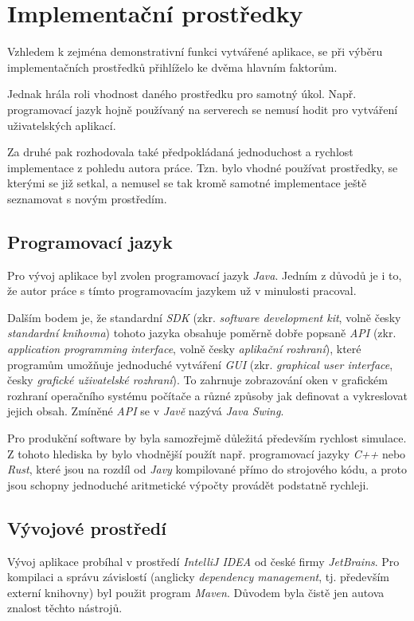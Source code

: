 \section{Implementační prostředky}

Vzhledem k zejména demonstrativní funkci vytvářené aplikace, se při výběru implementačních prostředků přihlíželo ke dvěma hlavním faktorům.

Jednak hrála roli vhodnost daného prostředku pro samotný úkol. Např. programovací jazyk hojně používaný na serverech se nemusí hodit pro vytváření uživatelských aplikací.

Za druhé pak rozhodovala také předpokládaná jednoduchost a rychlost implementace z pohledu autora práce. Tzn. bylo vhodné používat prostředky, se kterými se již setkal, a nemusel se tak kromě samotné implementace ještě seznamovat s novým prostředím.

\subsection{Programovací jazyk}

Pro vývoj aplikace byl zvolen programovací jazyk \emph{Java}. \parencite{gosling2005java} Jedním z důvodů je i to, že autor práce s tímto programovacím jazykem už v minulosti pracoval.

Dalším bodem je, že standardní \emph{SDK} (zkr. \emph{software development kit}, volně česky \emph{standardní knihovna}) tohoto jazyka obsahuje poměrně dobře popsaně \emph{API} (zkr. \emph{application programming interface}, volně česky \emph{aplikační rozhraní}), které programům umožňuje jednoduché vytváření \emph{GUI} (zkr. \emph{graphical user interface}, česky \emph{grafické uživatelské rozhraní}). To zahrnuje zobrazování oken v grafickém rozhraní operačního systému počítače a různé způsoby jak definovat a vykreslovat jejich obsah. Zmíněné \emph{API} se v \emph{Javě} nazývá \emph{Java Swing}.

Pro produkční software by byla samozřejmě důležitá především rychlost simulace. Z tohoto hlediska by bylo vhodnější použít např. programovací jazyky \emph{C++} nebo \emph{Rust}, které jsou na rozdíl od \emph{Javy} kompilované přímo do strojového kódu, a proto jsou schopny jednoduché aritmetické výpočty provádět podstatně rychleji.

\subsection{Vývojové prostředí}

Vývoj aplikace probíhal v prostředí \emph{IntelliJ IDEA} od české firmy \emph{JetBrains}. Pro kompilaci a správu závislostí (anglicky \emph{dependency management}, tj. především externí knihovny) byl použit program \emph{Maven}. Důvodem byla čistě jen autova znalost těchto nástrojů. 
